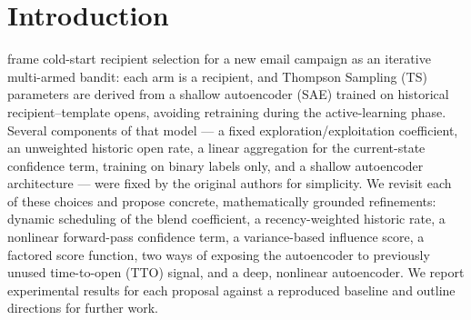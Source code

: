 \section{Introduction}
\label{sec:introduction}

\citet{zid2025active} frame cold-start recipient selection for a
new email campaign as an iterative multi-armed bandit: each arm is a
recipient, and Thompson Sampling (TS) parameters are derived from a shallow
autoencoder (SAE) trained on historical recipient--template opens, avoiding
retraining during the active-learning phase. Several components of that
model --- a fixed exploration/exploitation coefficient, an unweighted
historic open rate, a linear aggregation for the current-state confidence
term, training on binary labels only, and a shallow autoencoder architecture --- were
fixed by the original authors for simplicity. We revisit each of these
choices and propose concrete, mathematically grounded refinements: dynamic
scheduling of the blend coefficient, a recency-weighted historic rate, a
nonlinear forward-pass confidence term, a variance-based influence score, a
factored score function, two ways of exposing the autoencoder to previously
unused time-to-open (TTO) signal, and a deep, nonlinear autoencoder. We
report experimental results for each proposal against a reproduced baseline
and outline directions for further work.
